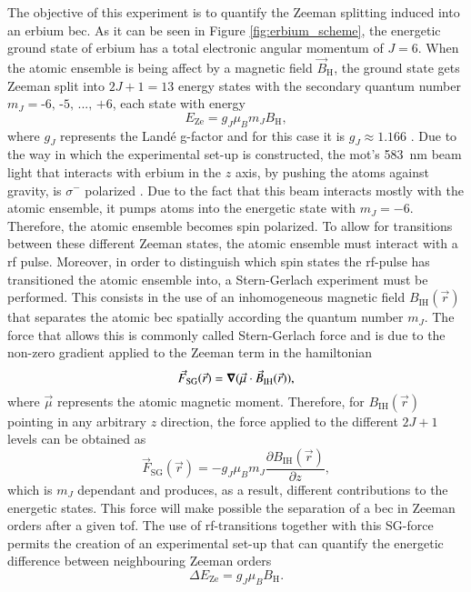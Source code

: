 The objective of this experiment is to quantify the Zeeman splitting induced into an erbium \ac{bec}. As it can be seen in Figure \ref{fig:erbium_scheme}, the energetic ground state of erbium has a total electronic angular momentum of $J = 6$. When the atomic ensemble is being affect by a magnetic field $\vec{B}_\text{H}$, the ground state gets Zeeman split into $2J+1 = 13$ energy states with the secondary quantum number $m_J = \text{-6, -5, ..., +6}$, each state with energy
\begin{equation}
	E_\text{Ze} = g_J \mu_B m_J B_\text{H},
\end{equation}
where $g_J$ represents the Landé g-factor and for this case it is $g_J\approx1.166$ \cite{Foot2005}. Due to the way in which the experimental set-up is constructed, the \ac{mot}'s \SI{583}{\nano\meter} beam light that interacts with erbium in the $z$ axis, by pushing the atoms against gravity, is $\sigma^-$ polarized \cite{Ulitzsch2016}. Due to the fact that this beam interacts mostly with the atomic ensemble, it pumps atoms into the energetic state with $m_J = -6$. Therefore, the atomic ensemble becomes spin polarized. To allow for transitions between these different Zeeman states, the atomic ensemble must interact with a \acf{rf} pulse. Moreover, in order to distinguish which spin states the \ac{rf}-pulse has transitioned the atomic ensemble into, a Stern-Gerlach experiment must be performed. This consists in the use of an inhomogeneous magnetic field $B_\text{IH}(\vec{r})$ that separates the atomic \ac{bec} spatially according the quantum number $m_J$. The force that allows this is commonly called Stern-Gerlach force and is due to the non-zero gradient applied to the Zeeman term in the hamiltonian \cite{Foot2005}
\begin{equation}
	\vec{F}_\text{SG}(\vec{r}) = \grad{(\vec{\mu}\cdot\vec{B}_\text{IH}(\vec{r}))},
\end{equation}
where $\vec{\mu}$ represents the atomic magnetic moment. Therefore, for $B_\text{IH}(\vec{r})$ pointing in any arbitrary $z$ direction, the force applied to the different $2J+1$ levels can be obtained as
\begin{equation}\label{eq:Stern-Gerlach_force}
	\vec{F}_\text{SG}(\vec{r}) = - g_J \mu_B m_J \frac{\partial B_\text{IH}(\vec{r})}{\partial z},
\end{equation}
which is $m_J$ dependant and produces, as a result, different contributions to the energetic states. This force will make possible the separation of a \ac{bec} in Zeeman orders after a given \ac{tof}. The use of \ac{rf}-transitions together with this SG-force permits the creation of an experimental set-up that can quantify the energetic difference between neighbouring Zeeman orders
\begin{equation}\label{eq:Zeeman_splitting_difference}
\Delta E_\text{Ze} = g_J \mu_B B_\text{H}.
\end{equation}

